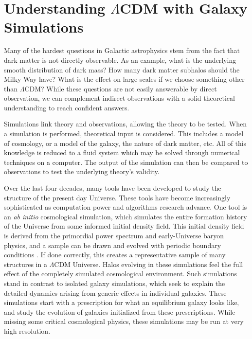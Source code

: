 



\section{Understanding $\Lambda$CDM with Galaxy Simulations}

Many of the hardest questions in Galactic astrophysics stem from the fact that dark matter is not directly observable. As an example, what is the underlying smooth distribution of dark mass? How many dark matter subhalos should the Milky Way have? What is the effect on large scales if we choose something other than $\Lambda$CDM? While these questions are not easily answerable by direct observation, we can complement indirect observations with a solid theoretical understanding to reach confident answers.

Simulations link theory and observations, allowing the theory to be tested. When a simulation is performed, theoretical input is considered. This includes a model of cosmology, or a model of the galaxy, the nature of dark matter, etc. All of this knowledge is reduced to a fluid system which may be solved through numerical techniques on a computer.  The output of the simulation can then be compared to observations to test the underlying theory's validity.

Over the last four decades, many tools have been developed to study the structure of the present day Universe. These tools have become increasingly sophisticated as computation power and algorithms research advance. One tool is an \textit{ab initio} cosmological simulation, which simulates the entire formation history of the Universe from some informed initial density field.  This initial density field is derived from the primordial power spectrum and early-Universe baryon physics, and a sample can be drawn and evolved with periodic boundary conditions \citep{music}. If done correctly, this creates a representative sample of many structures in a $\Lambda$CDM Universe. Halos evolving in these simulations feel the full effect of the completely simulated cosmological environment. Such simulations stand in contrast to isolated galaxy simulations, which seek to explain the detailed dynamics arising from generic effects in individual galaxies. These simulations start with a prescription for what an equilibrium galaxy looks like, and study the evolution of galaxies initialized from these prescriptions. While missing some critical cosmological physics, these simulations may be run at very high resolution.


